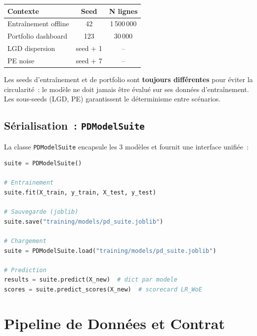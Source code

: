 \documentclass[12pt,a4paper]{article}
\begin{document}
\begin{warningbox}
\begin{center}
\begin{tabular}{lcc}
\toprule
\textbf{Contexte} & \textbf{Seed} & \textbf{N lignes} \\
\midrule
Entra\^inement offline & 42 & 1\,500\,000 \\
Portfolio dashboard & 123 & 30\,000 \\
LGD dispersion & seed + 1 & -- \\
PE noise & seed + 7 & -- \\
\bottomrule
\end{tabular}
\end{center}
Les seeds d'entra\^inement et de portfolio sont \textbf{toujours diff\'erentes} pour \'eviter la circularit\'e~: le mod\`ele ne doit jamais \^etre \'evalu\'e sur ses donn\'ees d'entra\^inement. Les sous-seeds (LGD, PE) garantissent le d\'eterminisme entre sc\'enarios.
\end{warningbox}

\subsection{S\'erialisation~: \texttt{PDModelSuite}}

La classe \texttt{PDModelSuite} encapsule les 3 mod\`eles et fournit une interface unifi\'ee~:

\begin{formulebox}
\begin{lstlisting}[language=Python]
suite = PDModelSuite()

# Entrainement
suite.fit(X_train, y_train, X_test, y_test)

# Sauvegarde (joblib)
suite.save("training/models/pd_suite.joblib")

# Chargement
suite = PDModelSuite.load("training/models/pd_suite.joblib")

# Prediction
results = suite.predict(X_new)  # dict par modele
scores = suite.predict_scores(X_new)  # scorecard LR_WoE
\end{lstlisting}
\end{formulebox}


\section{Pipeline de Donn\'ees et Contrat}
\label{sec:pipeline}
\end{document}
